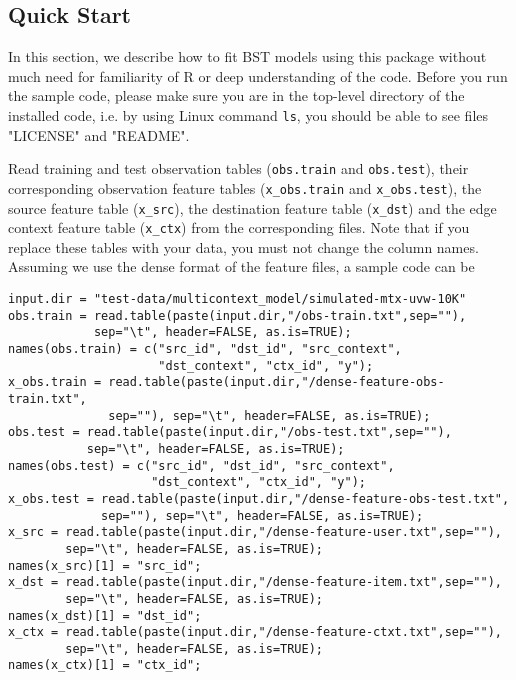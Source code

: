 
\subsection{Quick Start}
\label{sec:bst-quick-start}

In this section, we describe how to fit BST models using this package without much need for familiarity of R or deep understanding of the code. Before you run the sample code, please make sure you are in the top-level directory of the installed code, i.e. by using Linux command {\tt ls}, you should be able to see files "LICENSE" and "README".

Read training and test observation tables ({\tt obs.train} and {\tt obs.test}), their corresponding observation feature tables ({\tt x\_obs.train} and {\tt x\_obs.test}), the source feature table ({\tt x\_src}), the destination feature table ({\tt x\_dst}) and the edge context feature table ({\tt x\_ctx}) from the corresponding files.  Note that if you replace these tables with your data, you must not change the column names. Assuming we use the dense format of the feature files, a sample code can be
{\small\begin{verbatim}
input.dir = "test-data/multicontext_model/simulated-mtx-uvw-10K"
obs.train = read.table(paste(input.dir,"/obs-train.txt",sep=""), 
            sep="\t", header=FALSE, as.is=TRUE);
names(obs.train) = c("src_id", "dst_id", "src_context", 
                     "dst_context", "ctx_id", "y");
x_obs.train = read.table(paste(input.dir,"/dense-feature-obs-train.txt",
              sep=""), sep="\t", header=FALSE, as.is=TRUE);
obs.test = read.table(paste(input.dir,"/obs-test.txt",sep=""), 
           sep="\t", header=FALSE, as.is=TRUE);
names(obs.test) = c("src_id", "dst_id", "src_context", 
                    "dst_context", "ctx_id", "y");
x_obs.test = read.table(paste(input.dir,"/dense-feature-obs-test.txt",
             sep=""), sep="\t", header=FALSE, as.is=TRUE);
x_src = read.table(paste(input.dir,"/dense-feature-user.txt",sep=""),
        sep="\t", header=FALSE, as.is=TRUE);
names(x_src)[1] = "src_id";
x_dst = read.table(paste(input.dir,"/dense-feature-item.txt",sep=""),
        sep="\t", header=FALSE, as.is=TRUE);
names(x_dst)[1] = "dst_id";
x_ctx = read.table(paste(input.dir,"/dense-feature-ctxt.txt",sep=""),
        sep="\t", header=FALSE, as.is=TRUE);
names(x_ctx)[1] = "ctx_id";
\end{verbatim}}

